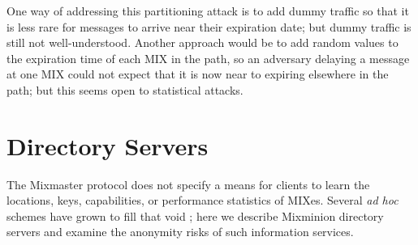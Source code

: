 \documentclass{llncs}
\begin{document}

One way of addressing this partitioning attack is to add dummy traffic
so that it is less rare for messages to arrive near their expiration date;
but dummy traffic is still not well-understood. Another approach would
be to add random values to the expiration time of each MIX in the path,
so an adversary delaying a message at one MIX could not expect that it
is now near to expiring elsewhere in the path; but this seems open to
statistical attacks.


%


\section{Directory Servers}
\label{sec:dir-servers}

The Mixmaster protocol does not specify a means for clients to learn the
locations, keys, capabilities, or performance statistics of MIXes. Several
\emph{ad hoc} schemes have grown to fill that void \cite{levien}; here
we describe Mixminion directory servers and examine the anonymity risks
of such information services.
\end{document}
